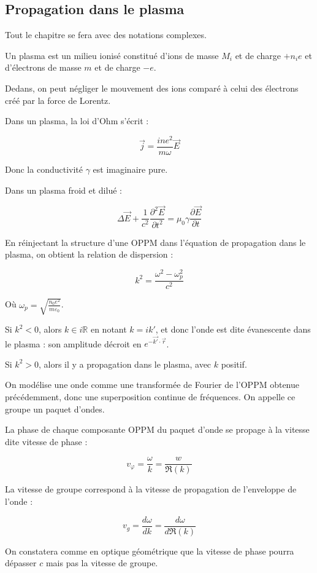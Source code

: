 \documentclass[a4paper,12pt]{book}
\newcommand{\Def}[2]{\begin{tcolorbox}[colback=white,colframe=red!10!green!20!blue!75!, title=Définition : #1]#2\end{tcolorbox}}
\newcommand{\Thr}[2]{\begin{tcolorbox}[sharp corners, colback=white,colframe=red!10!blue!30!green!75!, title=Théorème : #1]#2\end{tcolorbox}}
\def\R{\mathbb{R}}
\renewcommand{\Vec}[1]{\overrightarrow{#1}}
\begin{document}
\subsection{Propagation dans le plasma}
Tout le chapitre se fera avec des notations complexes.
\Def{Plasma}{Un plasma est un milieu ionisé constitué d'ions de masse $M_i$ et de charge $+n_ie$ et d'électrons de masse $m$ et de charge $-e$.
\par Dedans, on peut négliger le mouvement des ions comparé à celui des électrons créé par la force de Lorentz.
\par Dans un plasma, la loi d'Ohm s'écrit :
\par $$\Vec{j} = \frac{ine^2}{m\omega}\Vec{E}$$
\par Donc la conductivité $\gamma$ est imaginaire pure.}
\Thr{L'équation de propagation dans le plasma}{Dans un plasma froid et dilué :
\par $$\Delta\Vec{E} +\frac{1}{c^2}\dfrac{\partial^2\Vec{E}}{\partial t^2} = \mu_0\gamma\dfrac{\partial\Vec{E}}{\partial t}$$}
\Thr{Relation de dispersion}{En réinjectant la structure d'une OPPM dans l'équation de propagation dans le plasma, on obtient la relation de dispersion :
\par $$k^2 = \frac{\omega^2-\omega_p^2}{c^2}$$
\par Où $\omega_p =\sqrt{\frac{n_0e^2}{m\varepsilon_0}}$.
\par Si $k^2<0$, alors $k\in i\R$ en notant $k = ik'$, et donc l'onde est dite évanescente dans le plasma : son amplitude décroit en $e^{-\Vec{k'}\cdot\Vec{r}}$.
\par Si $k^2>0$, alors il y a propagation dans le plasma, avec $k$ positif.}
\Def{Vitesses}{On modélise une onde comme une transformée de Fourier de l'OPPM obtenue précédemment, donc une superposition continue de fréquences. On appelle ce groupe un paquet d'ondes.
\par La phase de chaque composante OPPM du paquet d'onde se propage à la vitesse dite vitesse de phase :
\par $$v_\varphi = \frac{\omega}{k} = \frac{w}{\Re(k)}$$
\par La vitesse de groupe correspond à la vitesse de propagation de l'enveloppe de l'onde :
\par $$v_g = \frac{d\omega}{dk} =\frac{d\omega}{d\Re(k)}$$
\par On constatera comme en optique géométrique que la vitesse de phase pourra dépasser $c$ mais pas la vitesse de groupe.}
\end{document}
